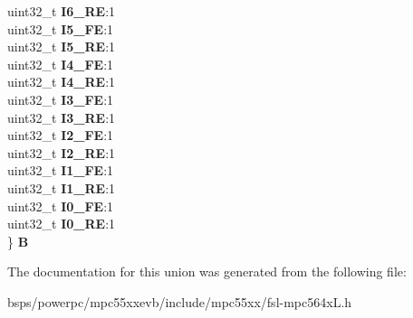 \begin{DoxyCompactItemize}
\begin{tabbing}
\>uint32\_t {\bfseries I6\_RE}:1\\
\>uint32\_t {\bfseries I5\_FE}:1\\
\>uint32\_t {\bfseries I5\_RE}:1\\
\>uint32\_t {\bfseries I4\_FE}:1\\
\>uint32\_t {\bfseries I4\_RE}:1\\
\>uint32\_t {\bfseries I3\_FE}:1\\
\>uint32\_t {\bfseries I3\_RE}:1\\
\>uint32\_t {\bfseries I2\_FE}:1\\
\>uint32\_t {\bfseries I2\_RE}:1\\
\>uint32\_t {\bfseries I1\_FE}:1\\
\>uint32\_t {\bfseries I1\_RE}:1\\
\>uint32\_t {\bfseries I0\_FE}:1\\
\>uint32\_t {\bfseries I0\_RE}:1\\
\} {\bfseries B}\\

\end{tabbing}\end{DoxyCompactItemize}


The documentation for this union was generated from the following file\+:\begin{DoxyCompactItemize}
\item 
bsps/powerpc/mpc55xxevb/include/mpc55xx/fsl-\/mpc564x\+L.\+h\end{DoxyCompactItemize}
